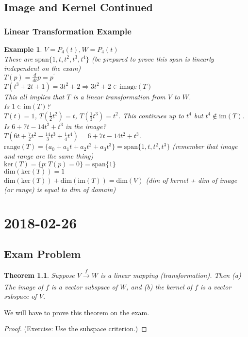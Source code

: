 \documentclass{report}
\newtheorem*{ex}{Example}
\newtheorem*{thrm}{Theorem}
\newcommand{\mychapter}[2]{
	\setcounter{chapter}{#1}
	\setcounter{section}{0}
	\chapter*{#2}
	\addcontentsline{toc}{chapter}{#2}
}
\begin{document}
\section{Image and Kernel Continued}
\subsection{Linear Transformation Example}
\begin{ex}
$V=P_4(t), W=P_4(t)$\\
These are $\mathrm{span}\{1,t,t^2,t^3,t^4\}$ (be prepared to prove this span is linearly independent on the exam)\\
$T(p) = \frac{d}{dt}p=p^\prime$\\
$T(t^3+2t+1)=3t^2+2 \Rightarrow 3t^2+2 \in \mathrm{image}(T)$\\
This all implies that $T$ is a linear transformation from $V$ to $W$.\\
Is $1 \in \mathrm{im}(T)$?\\
$T(t)=1$, $T(\frac{1}{2}t^2) = t$, $T(\frac{1}{3}t^3) = t^2$. This continues up to $t^4$ but $t^4 \not\in \mathrm{im}(T)$.\\
Is $6+7t-14t^2+t^3$ in the image?\\
$T(6t+\frac{7}{2}t^2-\frac{14}{3}t^3+\frac{1}{4}t^4) = 6+7t-14t^2+t^3$.\\
$\mathrm{range}(T)=\{a_0+a_1t+a_2t^2+a_3t^3\} = \mathrm{span}\{1,t,t^2,t^3\}$ (remember that image and range are the same thing)\\
$\mathrm{ker}(T)=\{p: T(p) = 0\} = \mathrm{span}\{1\}$\\
$\mathrm{dim}(\mathrm{ker}(T))=1$\\
$\mathrm{dim}(\mathrm{ker}(T)) + \mathrm{dim}(\mathrm{im}(T)) = \mathrm{dim}(V)$ (dim of kernel + dim of image (or range) is equal to dim of domain)
\end{ex}


\mychapter{21}{2018-02-26}
\section{Exam Problem}
\begin{thrm}
Suppose $V\xrightarrow[]{f} W$ is a linear mapping (transformation). Then (a) The image of $f$ is a vector subspace of $W$, and (b) the kernel of $f$ is a vector subspace of $V$.
\end{thrm}
We will have to prove this theorem on the exam.
\begin{proof}
(Exercise: Use the subspace criterion.)
\end{proof}
\end{document}
